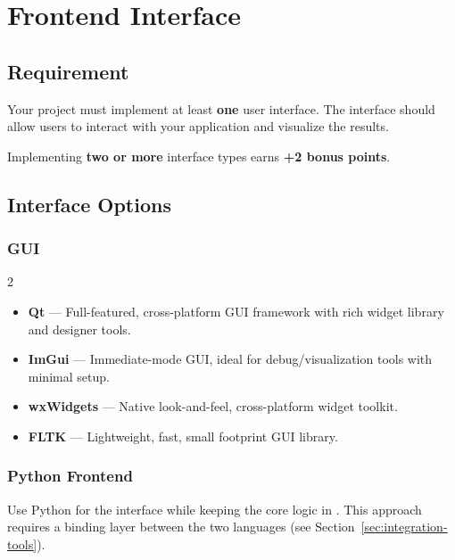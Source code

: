 
\section{Frontend Interface}

\subsection{Requirement}

Your project must implement at least \textbf{one} user interface. The interface should allow users to interact with your application and visualize the results.

\begin{notebox}
Implementing \textbf{two or more} interface types earns \textbf{+2 bonus points}.
\end{notebox}

\subsection{Interface Options}

\subsubsection{\cpp{} GUI}

\begin{multicols}{2}
\begin{itemize}
  \item \textbf{Qt} --- Full-featured, cross-platform GUI framework with rich widget library and designer tools.
  \item \textbf{ImGui} --- Immediate-mode GUI, ideal for debug/visualization tools with minimal setup.
  \item \textbf{wxWidgets} --- Native look-and-feel, cross-platform widget toolkit.
  \item \textbf{FLTK} --- Lightweight, fast, small footprint GUI library.
\end{itemize}
\end{multicols}

\subsubsection{Python Frontend}

Use Python for the interface while keeping the core logic in \cpp{}. This approach requires a binding layer between the two languages (see Section~\ref{sec:integration-tools}).

